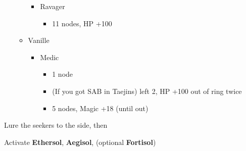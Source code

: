 \begin{multicols}{2}
\begin{menu}
\begin{itemize}
\begin{itemize}
\begin{itemize}
                \item Ravager
                      \begin{itemize}
                        \item 11 nodes, HP +100
                      \end{itemize}
              \end{itemize}
        \item Vanille
              \begin{itemize}
                \item Medic
                      \begin{itemize}
                        \item 1 node
                        \item (If you got SAB in Taejins) left 2, HP +100 out of ring twice
                        \item 5 nodes, Magic +18 (until out)
                      \end{itemize}
              \end{itemize}
      \end{itemize}
    \end{itemize}
  \end{menu}


  Lure the seekers to the side, then 
\end{multicols}
Activate \textbf{Ethersol}, \textbf{Aegisol}, (optional \textbf{Fortisol})
\renewcommand{\first}{[1] Guerilla (\syn/\rav/\sab)}
\renewcommand{\second}{[2] Tri-Disaster (\rav/\rav/\rav)}
\renewcommand{\third}{[3] Thaumaturgy (\rav/\rav/\med)}
\renewcommand{\fourth}{[4] Tireless Charge (\com/\com/\med)}
\renewcommand{\fifth}{[5] Smart Bomb (\rav/\rav/\sab)}
\renewcommand{\sixth}{[6] Aggression (\com/\com/\rav)}
